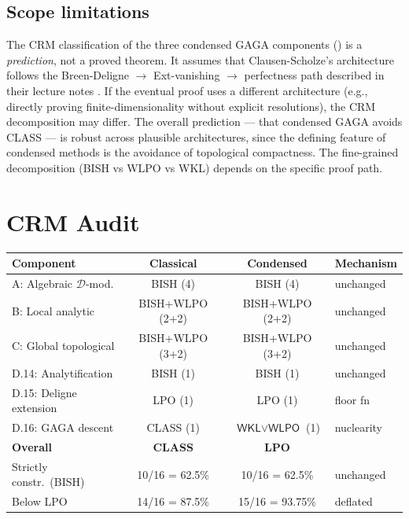 \documentclass[11pt,a4paper]{article}
\theoremstyle{plain}
\theoremstyle{definition}
\newcommand{\BISH}{\textsf{BISH}}
\newcommand{\WKL}{\textsf{WKL}}
\newcommand{\WLPO}{\textsf{WLPO}}
\newcommand{\LPO}{\textsf{LPO}}
\newcommand{\CLASS}{\textsf{CLASS}}
\begin{document}
\subsection{Scope limitations}

The CRM classification of the three condensed GAGA components () is a \emph{prediction}, not a proved theorem.
It assumes that Clausen-Scholze's architecture follows the Breen-Deligne $\to$ Ext-vanishing $\to$ perfectness path described in their lecture notes \cite{ClausenScholze2022}.
If the eventual proof uses a different architecture (e.g., directly proving finite-dimensionality without explicit resolutions), the CRM decomposition may differ.
The overall prediction --- that condensed GAGA avoids \CLASS{} --- is robust across plausible architectures, since the defining feature of condensed methods is the avoidance of topological compactness.
The fine-grained decomposition (\BISH{} vs \WLPO{} vs \WKL) depends on the specific proof path.

\section{CRM Audit}
\label{sec:audit}

\begin{center}
\small
\begin{tabular}{@{}lccl@{}}
\toprule
Component & Classical & Condensed & Mechanism \\
\midrule
A: Algebraic $\mathcal{D}$-mod. & \BISH{} (4) & \BISH{} (4) & unchanged \\
B: Local analytic & \BISH+\WLPO{} (2+2) & \BISH+\WLPO{} (2+2) & unchanged \\
C: Global topological & \BISH+\WLPO{} (3+2) & \BISH+\WLPO{} (3+2) & unchanged \\
D.14: Analytification & \BISH{} (1) & \BISH{} (1) & unchanged \\
D.15: Deligne extension & \LPO{} (1) & \LPO{} (1) & floor fn \\
D.16: GAGA descent & \CLASS{} (1) & $\WKL\!\vee\!\WLPO$ (1) & nuclearity \\
\midrule
\textbf{Overall} & \textbf{\CLASS} & \textbf{\LPO} & \\
Strictly constr.\ (\BISH) & 10/16 = 62.5\% & 10/16 = 62.5\% & unchanged \\
Below \LPO & 14/16 = 87.5\% & 15/16 = 93.75\% & deflated \\
\bottomrule
\end{tabular}
\end{center}
\end{document}
